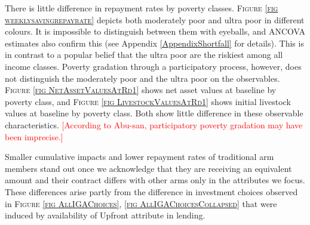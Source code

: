 	There is little difference in repayment rates by poverty classes. \textsc{\footnotesize Figure \ref{fig weeklysavingrepayrate}} depicts both moderately poor and ultra poor in different colours. It is impossible to distinguish between them with eyeballs, and ANCOVA estimates also confirm this (see Appendix \ref{AppendixShortfall} for details). This is in contrast to a popular belief that the ultra poor are the riskiest among all income classes. Poverty gradation through a participatory process, however, does not distinguish the moderately poor and the ultra poor on the observables. \textsc{\footnotesize Figure \ref{fig NetAssetValuesAtRd1}} shows net asset values at baseline by poverty class, and \textsc{\footnotesize Figure \ref{fig LivestockValuesAtRd1}} shows initial livestock values at baseline by poverty class. Both show little difference in these observable characteristics. \textcolor{red}{[According to Abu-san, participatory poverty gradation may have been imprecise.]}

	Smaller cumulative impacts and lower repayment rates of \textsf{traditional} arm members stand out once we acknowledge that they are receiving an equivalent amount and their contract differs with other arms only in the attributes we focus. These differences arise partly from the difference in investment choices observed in \textsc{\small Figure \ref{fig AllIGAChoices}, \ref{fig AllIGAChoicesCollapsed}} that were induced by availability of \textsf{Upfront} attribute in lending.
	
